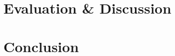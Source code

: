 \documentclass[12pt]{report}
\begin{document}
\chapter{Evaluation \& Discussion}


\chapter{Conclusion}





%



\end{document}
